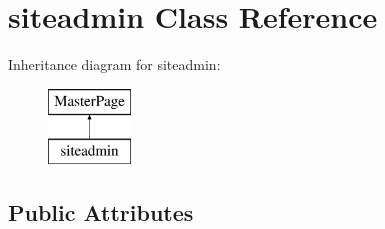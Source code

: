 \hypertarget{classsiteadmin}{\section{siteadmin Class Reference}
\label{classsiteadmin}
}
Inheritance diagram for siteadmin\-:\begin{figure}[H]
\begin{center}
\leavevmode
\includegraphics[height=2.000000cm]{classsiteadmin}
\end{center}
\end{figure}
\subsection*{Public Attributes}
